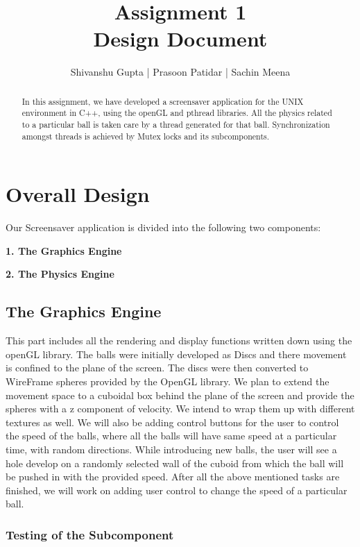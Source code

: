 \documentclass{report}
\begin{document}
\title{Assignment 1 \\ Design Document}
\author{Shivanshu Gupta | Prasoon Patidar | Sachin Meena}

\maketitle
\pagebreak
\begin{abstract}
In this assignment, we have developed a screensaver application for the UNIX environment in C++, using the openGL and pthread libraries. All the physics related to a particular ball is taken care by a thread generated for that ball. Synchronization amongst threads is achieved by Mutex locks and its subcomponents.
\end{abstract}
\pagebreak
\section{Overall Design}
Our Screensaver application is divided into the following two components:
\begin{flushleft}
\textbf{1. The Graphics Engine}
\end{flushleft}
\textbf{2. The Physics Engine}
\subsection{The Graphics Engine}

This part includes all the rendering and display functions written down using the openGL library. The balls were initially developed as Discs and there movement is confined to the plane of the screen. The discs were then converted to WireFrame spheres provided by the OpenGL library. We  plan to extend the movement space to a cuboidal box behind the plane of the screen and provide the spheres with a z component of velocity. We intend to wrap them up with different textures as well. We will also be adding control buttons for the user to control the speed of the balls, where all the balls will have same speed at a particular time, with random directions. While introducing new balls, the user will see a hole develop on a randomly selected wall of the cuboid from which the ball will be pushed in with the provided speed. After all the above mentioned tasks are finished, we will work on adding user control to change the speed of a particular ball.

\subsubsection{Testing of the Subcomponent}
\end{document}
